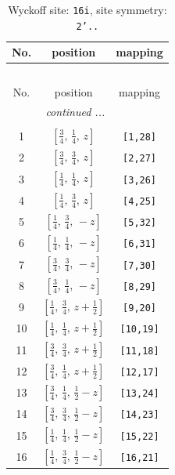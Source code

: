 \documentclass[fleqn,8pt]{jsarticle}
\begin{document}
\begin{longtable}{ccc}
\caption{Wyckoff site: {\tt 16i}, site symmetry: {\tt 2'..}}
 \\
 \hline \hline
No. & position & mapping \\ \hline \endfirsthead

\multicolumn{2}{l}{\tablename\ \thetable{}} \\
 \hline \hline
No. & position & mapping \\ \hline \endhead

 \hline \hline
\multicolumn{2}{r}{\footnotesize\it continued ...} \\ \endfoot

 \hline \hline
\multicolumn{2}{r}{} \\ \endlastfoot

1 & $\left[ \frac{3}{4},\, \frac{1}{4},\, z \right]$ & {\tt [1,28]} \\ \hline
2 & $\left[ \frac{3}{4},\, \frac{3}{4},\, z \right]$ & {\tt [2,27]} \\ \hline
3 & $\left[ \frac{1}{4},\, \frac{1}{4},\, z \right]$ & {\tt [3,26]} \\ \hline
4 & $\left[ \frac{1}{4},\, \frac{3}{4},\, z \right]$ & {\tt [4,25]} \\ \hline
5 & $\left[ \frac{1}{4},\, \frac{3}{4},\, - z \right]$ & {\tt [5,32]} \\ \hline
6 & $\left[ \frac{1}{4},\, \frac{1}{4},\, - z \right]$ & {\tt [6,31]} \\ \hline
7 & $\left[ \frac{3}{4},\, \frac{3}{4},\, - z \right]$ & {\tt [7,30]} \\ \hline
8 & $\left[ \frac{3}{4},\, \frac{1}{4},\, - z \right]$ & {\tt [8,29]} \\ \hline
9 & $\left[ \frac{1}{4},\, \frac{3}{4},\, z + \frac{1}{2} \right]$ & {\tt [9,20]} \\ \hline
10 & $\left[ \frac{1}{4},\, \frac{1}{4},\, z + \frac{1}{2} \right]$ & {\tt [10,19]} \\ \hline
11 & $\left[ \frac{3}{4},\, \frac{3}{4},\, z + \frac{1}{2} \right]$ & {\tt [11,18]} \\ \hline
12 & $\left[ \frac{3}{4},\, \frac{1}{4},\, z + \frac{1}{2} \right]$ & {\tt [12,17]} \\ \hline
13 & $\left[ \frac{3}{4},\, \frac{1}{4},\, \frac{1}{2} - z \right]$ & {\tt [13,24]} \\ \hline
14 & $\left[ \frac{3}{4},\, \frac{3}{4},\, \frac{1}{2} - z \right]$ & {\tt [14,23]} \\ \hline
15 & $\left[ \frac{1}{4},\, \frac{1}{4},\, \frac{1}{2} - z \right]$ & {\tt [15,22]} \\ \hline
16 & $\left[ \frac{1}{4},\, \frac{3}{4},\, \frac{1}{2} - z \right]$ & {\tt [16,21]} \\
\end{longtable}
\end{document}
